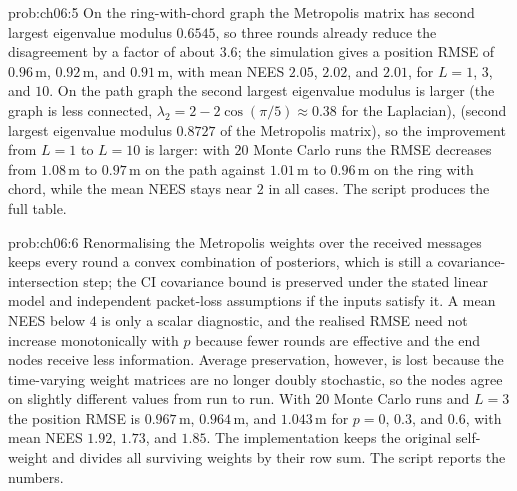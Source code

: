 \begin{sol}{prob:ch06:5}
On the ring-with-chord graph the Metropolis matrix has second largest eigenvalue modulus $0.6545$, so three rounds already reduce the disagreement by a factor of about $3.6$; the simulation gives a position RMSE of $0.96$\,m, $0.92$\,m, and $0.91$\,m, with mean NEES $2.05$, $2.02$, and $2.01$, for $L=1$, $3$, and $10$. On the path graph the second largest eigenvalue modulus is larger (the graph is less connected, $\lambda_2=2-2\cos(\pi/5)\approx0.38$ for the Laplacian), (second largest eigenvalue modulus $0.8727$ of the Metropolis matrix), so the improvement from $L=1$ to $L=10$ is larger: with $20$ Monte Carlo runs the RMSE decreases from $1.08$\,m to $0.97$\,m on the path against $1.01$\,m to $0.96$\,m on the ring with chord, while the mean NEES stays near $2$ in all cases. The script  produces the full table.
\end{sol}

\begin{sol}{prob:ch06:6}
Renormalising the Metropolis weights over the received messages keeps every round a convex combination of posteriors, which is still a covariance-intersection step; the CI covariance bound is preserved under the stated linear model and independent packet-loss assumptions if the inputs satisfy it. A mean NEES below $4$ is only a scalar diagnostic, and the realised RMSE need not increase monotonically with $p$ because fewer rounds are effective and the end nodes receive less information. Average preservation, however, is lost because the time-varying weight matrices are no longer doubly stochastic, so the nodes agree on slightly different values from run to run. With $20$ Monte Carlo runs and $L=3$ the position RMSE is $0.967$\,m, $0.964$\,m, and $1.043$\,m for $p=0$, $0.3$, and $0.6$, with mean NEES $1.92$, $1.73$, and $1.85$. The implementation keeps the original self-weight and divides all surviving weights by their row sum. The script  reports the numbers.
\end{sol}

